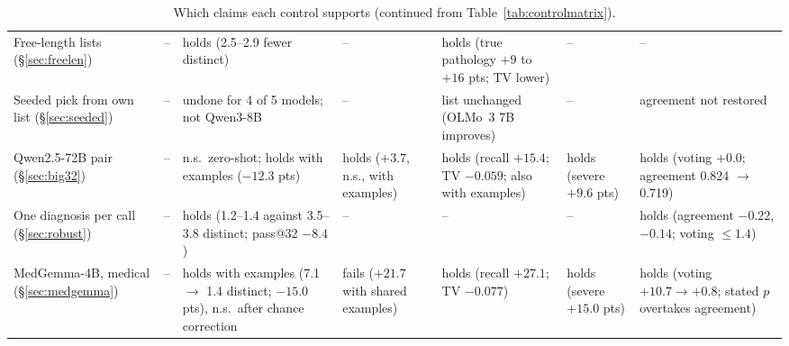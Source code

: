 \documentclass[11pt]{article}
\begin{document}
\begin{table}[p]
\begin{tabular}{L{2.2cm}L{1.7cm}L{2.0cm}L{1.8cm}L{2.0cm}L{2.3cm}L{1.9cm}}
Free-length lists (\S\ref{sec:freelen}) & -- & holds (2.5--2.9 fewer distinct) & -- & holds (true pathology $+9$ to $+16$ pts; TV lower) & -- & -- \\
Seeded pick from own list (\S\ref{sec:seeded}) & -- & undone for 4 of 5 models; not Qwen3-8B & -- & list unchanged (OLMo~3 7B improves) & -- & agreement not restored \\
Qwen2.5-72B pair (\S\ref{sec:big32}) & -- & n.s.\ zero-shot; holds with examples ($-12.3$ pts) & holds ($+3.7$, n.s., with examples) & holds (recall $+15.4$; TV $-0.059$; also with examples) & holds (severe $+9.6$ pts) & holds (voting $+0.0$; agreement 0.824 $\rightarrow$ 0.719) \\
One diagnosis per call (\S\ref{sec:robust}) & -- & holds (1.2--1.4 against 3.5--3.8 distinct; pass@32 $-8.4$) & -- & -- & -- & holds (agreement $-0.22$, $-0.14$; voting $\leq 1.4$) \\
MedGemma-4B, medical (\S\ref{sec:medgemma}) & -- & holds with examples (7.1 $\rightarrow$ 1.4 distinct; $-15.0$ pts), n.s.\ after chance correction & fails ($+21.7$ with shared examples) & holds (recall $+27.1$; TV $-0.077$) & holds (severe $+15.0$ pts) & holds (voting $+10.7 \rightarrow +0.8$; stated $p$ overtakes agreement) \\
\bottomrule
\end{tabular}
\caption{Which claims each control supports (continued from Table~\ref{tab:controlmatrix}).}
\label{tab:controlmatrix2}
\end{table}
\clearpage
\end{document}
